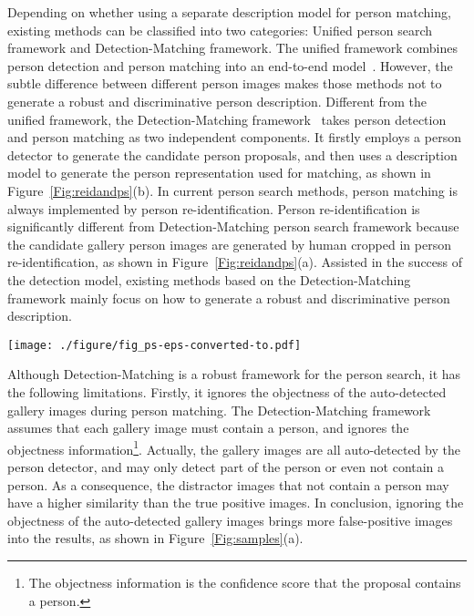 \documentclass[journal]{IEEEtran}
\begin{document}
Depending on whether using a separate description model for person matching, existing methods can be classified into two categories: Unified person search framework and Detection-Matching framework. 
The unified framework combines person detection and person matching into an end-to-end model~\cite{LiYC18,XiaoLWLW17,LiuFJKZQJY17,DBLP:conf/cvpr/MunjalATG19}. 
However, the subtle difference between different person images makes those methods not to generate a robust and discriminative person description. 
Different from the unified framework, the Detection-Matching framework~\cite{ZhengZSCYT17,LanZG18,ChenZOYT18,DBLP:conf/cvpr/YanZNZXY19} takes person detection and person matching as two independent components.
It firstly employs a person detector to generate the candidate person proposals, and then uses a description model to generate the person representation used for matching, as shown in Figure~\ref{Fig:reidandps}(b).
In current person search methods, person matching is always implemented by person re-identification.
Person re-identification is significantly different from Detection-Matching person search framework because the candidate gallery person images are generated by human cropped in person re-identification, as shown in Figure~\ref{Fig:reidandps}(a). 
Assisted in the success of the detection model, existing methods based on the Detection-Matching framework mainly focus on how to generate a robust and discriminative person description.


\begin{figure*}
\begin{center}
\texttt{[image: ./figure/fig\_ps-eps-converted-to.pdf]}
\end{center}
\caption{The illustration of person re-identification (a) and Detection-Matching person search framework (b).}
\label{Fig:reidandps}
\end{figure*}


Although Detection-Matching is a robust framework for the person search, it has the following limitations. 
Firstly, it ignores the objectness of the auto-detected gallery images during person matching.   
The Detection-Matching framework assumes that each gallery image must contain a person, and ignores the objectness information\footnote{The objectness information is the confidence score that the proposal contains a person.}.
Actually, the gallery images are all auto-detected by the person detector,  and may only detect part of the person or even not contain a person.
As a consequence, the distractor images that not contain a person may have a higher similarity than the true positive images.
In conclusion, ignoring the objectness of the auto-detected gallery images brings more false-positive images into the results, as shown in Figure~\ref{Fig:samples}(a).
\end{document}
